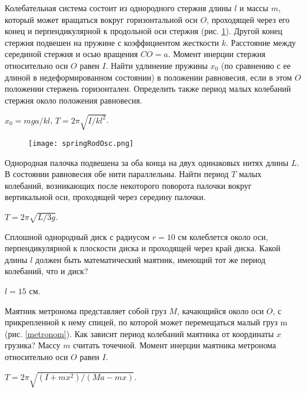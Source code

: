 \begin{ex} %
Колебательная система состоит из однородного стержня длины $l$ и массы $m$, который может вращаться вокруг горизонтальной оси $O$, проходящей через его конец и перпендикулярной к продольной оси стержня (рис. \ref{springRodOsc}). Другой конец стержня подвешен на пружине с коэффициентом жесткости $k$. Расстояние между серединой стержня и осью вращения $CO = a$. Момент инерции стержня относительно оси $O$ равен $I$. Найти удлинение пружины $x_0$ (по сравнению с ее длиной в недеформированном состоянии) в положении равновесия, если в этом $O$ положении стержень горизонтален. Определить также период малых колебаний стержня около положения равновесия.
\begin{ans}
$x_0 = mga/kl$, $T = 2 \pi \sqrt{I/kl^2}$.
\end{ans}
\end{ex}	

\begin{figure}[h]
\centering
\texttt{[image: springRodOsc.png]}
\caption{}
\label{springRodOsc}
\end{figure}

\begin{ex} %
Однородная палочка подвешена за оба конца на двух одинаковых нитях длины $L$. В состоянии равновесия обе нити параллельны. Найти период $T$ малых колебаний, возникающих после некоторого поворота палочки вокруг вертикальной оси, проходящей через середину палочки.
\begin{ans}
$T = 2 \pi \sqrt{L/3g}$.
\end{ans}
\end{ex}	

\begin{ex} %
Сплошной однородный диск с радиусом $r = 10$ см колеблется около оси, перпендикулярной к плоскости диска и проходящей через край диска. Какой длины $l$ должен быть математический маятник, имеющий тот же период колебаний, что и диск?
\begin{ans}
$l = 15$ см.
\end{ans}
\end{ex}	

\begin{ex} %
Маятник метронома представляет собой груз $M$, качающийся около оси $O$, с прикрепленной к нему спицей, по которой может перемещаться малый груз m (рис. \ref{metronom}). Как зависит период колебаний маятника от координаты $x$ грузика? Массу $m$ считать точечной. Момент инерции маятника метронома относительно оси $O$ равен $I$.
\begin{ans}
$T = 2 \pi \sqrt{(I+mx^2)/(Ma - mx)}$.
\end{ans}
\end{ex}	

